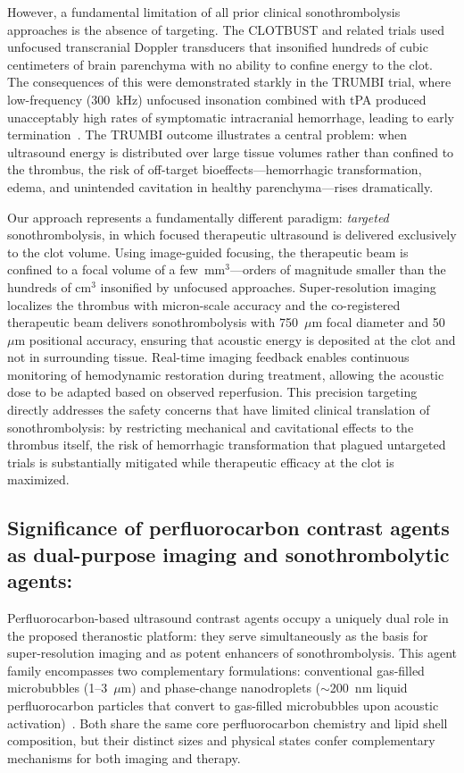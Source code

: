 However, a fundamental limitation of all prior clinical sonothrombolysis approaches is the absence of targeting. The CLOTBUST and related trials used unfocused transcranial Doppler transducers that insonified hundreds of cubic centimeters of brain parenchyma with no ability to confine energy to the clot. The consequences of this were demonstrated starkly in the TRUMBI trial, where low-frequency (300~kHz) unfocused insonation combined with tPA produced unacceptably high rates of symptomatic intracranial hemorrhage, leading to early termination~\cite{daffertshofer2005transcranial}. The TRUMBI outcome illustrates a central problem: when ultrasound energy is distributed over large tissue volumes rather than confined to the thrombus, the risk of off-target bioeffects---hemorrhagic transformation, edema, and unintended cavitation in healthy parenchyma---rises dramatically.

Our approach represents a fundamentally different paradigm: \textit{targeted} sonothrombolysis, in which focused therapeutic ultrasound is delivered exclusively to the clot volume. Using image-guided focusing, the therapeutic beam is confined to a focal volume of a few~mm$^3$---orders of magnitude smaller than the hundreds of cm$^3$ insonified by unfocused approaches. Super-resolution imaging localizes the thrombus with micron-scale accuracy and the co-registered therapeutic beam delivers sonothrombolysis with 750~$\mu$m focal diameter and 50~$\mu$m positional accuracy, ensuring that acoustic energy is deposited at the clot and not in surrounding tissue. Real-time imaging feedback enables continuous monitoring of hemodynamic restoration during treatment, allowing the acoustic dose to be adapted based on observed reperfusion. This precision targeting directly addresses the safety concerns that have limited clinical translation of sonothrombolysis: by restricting mechanical and cavitational effects to the thrombus itself, the risk of hemorrhagic transformation that plagued untargeted trials is substantially mitigated while therapeutic efficacy at the clot is maximized.

\subsection{Significance of perfluorocarbon contrast agents as dual-purpose imaging and sonothrombolytic agents:}
Perfluorocarbon-based ultrasound contrast agents occupy a uniquely dual role in the proposed theranostic platform: they serve simultaneously as the basis for super-resolution imaging and as potent enhancers of sonothrombolysis. This agent family encompasses two complementary formulations: conventional gas-filled microbubbles (1--3~$\mu$m) and phase-change nanodroplets ($\sim$200~nm liquid perfluorocarbon particles that convert to gas-filled microbubbles upon acoustic activation)~\cite{bautista2023current}. Both share the same core perfluorocarbon chemistry and lipid shell composition, but their distinct sizes and physical states confer complementary mechanisms for both imaging and therapy.

